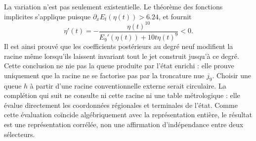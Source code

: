 La variation n'est pas seulement existentielle. Le théorème des fonctions implicites s'applique puisque \(\partial_xE_t(\eta(t))>6.24\), et fournit
\begin{equation}
 \eta'(t)=-
 \frac{\eta(t)^{10}}
 {E_9'(\eta(t))+10t\eta(t)^9}<0.
 \label{eq:alpha-variacion-raiz-prolongacion}
\end{equation}
Il est ainsi prouvé que les coefficients postérieurs au degré neuf modifient
la racine même lorsqu’ils laissent invariant tout le jet construit jusqu’à ce degré.
Cette conclusion ne nie pas la queue produite par l’état enrichi : elle prouve
uniquement que la racine ne se factorise pas par la troncature nue
\(j_9\). Choisir une queue \(h\) à partir d’une racine conventionnelle externe
serait circulaire. La complétion qui suit ne consulte ni cette racine ni une table
métrologique : elle évalue directement les coordonnées régionales et terminales de
l’état. Comme cette évaluation coïncide algébriquement avec la représentation
entière, le résultat est une représentation corrélée, non une affirmation
d’indépendance entre deux sélecteurs.


